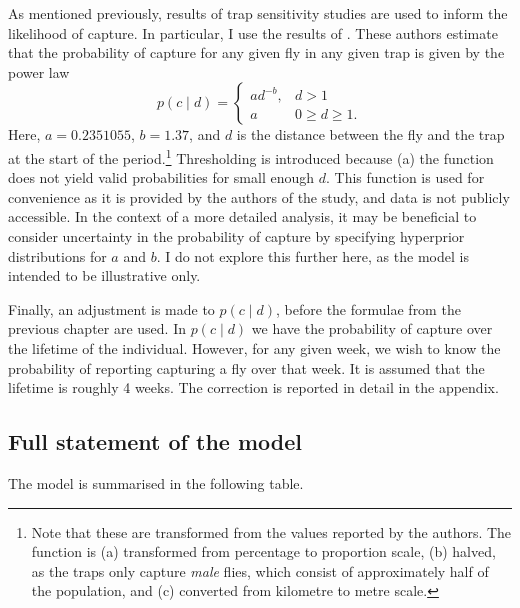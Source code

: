 \documentclass[
  oneside]{book}
\begin{document}
As mentioned previously, results of trap sensitivity studies are used to inform the likelihood of capture. In particular, I use the results of \citet{meats2005}. These authors estimate that the probability of capture for any given fly in any given trap is given by the power law
\[
p(c \mid d) = \begin{cases}ad^{-b}, & d>1 \\ a & 0 \geq d \geq 1.\end{cases}
\]
Here, \(a = 0.2351055\), \(b = 1.37\), and \(d\) is the distance between the fly and the trap at the start of the period.\footnote{Note that these are transformed from the values reported by the authors. The function is (a) transformed from percentage to proportion scale, (b) halved, as the traps only capture \emph{male} flies, which consist of approximately half of the population, and (c) converted from kilometre to metre scale.} Thresholding is introduced because (a) the function does not yield valid probabilities for small enough \(d\). This function is used for convenience as it is provided by the authors of the study, and data is not publicly accessible. In the context of a more detailed analysis, it may be beneficial to consider uncertainty in the probability of capture by specifying hyperprior distributions for \(a\) and \(b\). I do not explore this further here, as the model is intended to be illustrative only.

Finally, an adjustment is made to \(p(c \mid d)\), before the formulae from the previous chapter are used. In \(p(c \mid d)\) we have the probability of capture over the lifetime of the individual. However, for any given week, we wish to know the probability of reporting capturing a fly over that week. It is assumed that the lifetime is roughly 4 weeks. The correction is reported in detail in the appendix.

\hypertarget{full-statement-of-the-model}{%
\subsection{Full statement of the model}\label{full-statement-of-the-model}}

The model is summarised in the following table.
\end{document}
